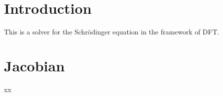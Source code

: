 \documentclass[11pt]{article}
\begin{document}
\section{Introduction}

This is a solver for the Schr\"odinger equation in the framework of DFT.

\section{Jacobian}

xx
\end{document}
